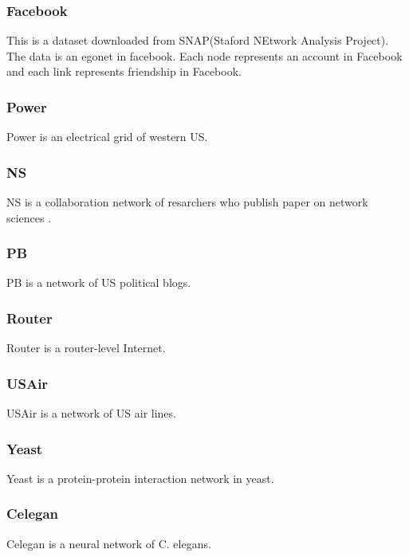 \documentclass[12pt]{article}
\begin{document}
\subsubsection{Facebook}
This is a dataset downloaded from SNAP(Staford NEtwork Analysis Project)\cite{snapnets}. The data is an egonet in facebook. Each node represents an account in Facebook and each link represents friendship in Facebook.
\subsubsection{Power}
Power is  an electrical grid of western US\cite{small_world}.
\subsubsection{NS}
NS is a collaboration network of resarchers who publish paper on network sciences \cite{Newman_2006}.
\subsubsection{PB}
PB is a network of US political blogs.\cite{pb}
\subsubsection{Router}
Router is a router-level Internet.\cite{router}
\subsubsection{USAir}
USAir is a network of US air lines. \cite{usair}
\subsubsection{Yeast}
Yeast is a protein-protein interaction network in yeast.\cite{yeast}

\subsubsection{Celegan}
Celegan is a neural network of C. elegans.\cite{small_world}
\end{document}
